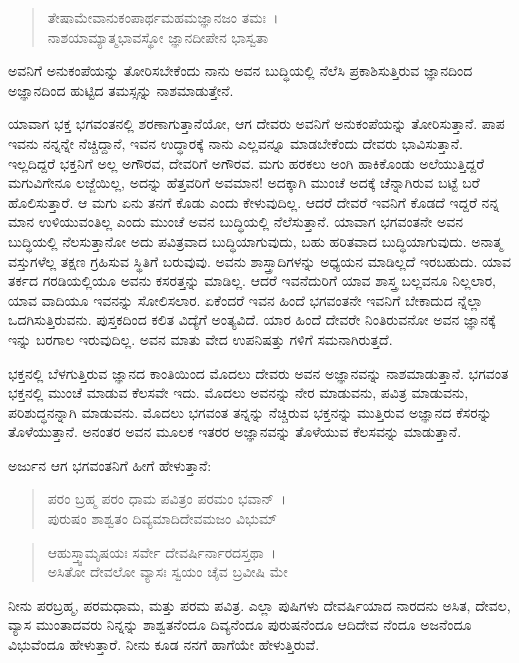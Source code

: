\begin{verse}
ತೇಷಾಮೇವಾನುಕಂಪಾರ್ಥಮಹಮಜ್ಞಾನಜಂ ತಮಃ~।\\ನಾಶಯಾಮ್ಯಾತ್ಮಭಾವಸ್ಥೋ ಜ್ಞಾನದೀಪೇನ ಭಾಸ್ವತಾ 
\end{verse}

{\small ಅವನಿಗೆ ಅನುಕಂಪೆಯನ್ನು ತೋರಿಸಬೇಕೆಂದು ನಾನು ಅವನ ಬುದ್ಧಿಯಲ್ಲಿ ನೆಲೆಸಿ ಪ್ರಕಾಶಿಸುತ್ತಿರುವ ಜ್ಞಾನದಿಂದ ಅಜ್ಞಾನದಿಂದ ಹುಟ್ಟಿದ ತಮಸ್ಸನ್ನು ನಾಶಮಾಡುತ್ತೇನೆ.}

ಯಾವಾಗ ಭಕ್ತ ಭಗವಂತನಲ್ಲಿ ಶರಣಾಗುತ್ತಾನೆಯೋ, ಆಗ ದೇವರು ಅವನಿಗೆ ಅನುಕಂಪೆಯನ್ನು ತೋರಿಸುತ್ತಾನೆ. ಪಾಪ ಇವನು ನನ್ನನ್ನೇ ನೆಚ್ಚಿದ್ದಾನೆ, ಇವನ ಉದ್ಧಾರಕ್ಕೆ ನಾನು ಎಲ್ಲವನ್ನೂ ಮಾಡಬೇಕೆಂದು ದೇವರು ಭಾವಿಸುತ್ತಾನೆ. ಇಲ್ಲದಿದ್ದರೆ ಭಕ್ತನಿಗೆ ಅಲ್ಲ ಅಗೌರವ, ದೇವರಿಗೆ ಅಗೌರವ. ಮಗು ಹರಕಲು ಅಂಗಿ ಹಾಕಿಕೊಂಡು ಅಲೆಯುತ್ತಿದ್ದರೆ ಮಗುವಿಗೇನೂ ಲಜ್ಜೆಯಿಲ್ಲ, ಅದನ್ನು ಹೆತ್ತವರಿಗೆ ಅವಮಾನ! ಅದಕ್ಕಾಗಿ ಮುಂಚೆ ಅದಕ್ಕೆ ಚೆನ್ನಾಗಿರುವ ಬಟ್ಟೆ ಬರೆ ಹೊಲಿಸುತ್ತಾರೆ. ಆ ಮಗು ಏನು ತನಗೆ ಕೊಡು ಎಂದು ಕೇಳುವುದಿಲ್ಲ. ಆದರೆ ದೇವರೆ ಇವನಿಗೆ ಕೊಡದೆ ಇದ್ದರೆ ನನ್ನ ಮಾನ ಉಳಿಯುವಂತಿಲ್ಲ ಎಂದು ಮುಂಚೆ ಅವನ ಬುದ್ಧಿಯಲ್ಲಿ ನೆಲೆಸುತ್ತಾನೆ. ಯಾವಾಗ ಭಗವಂತನೇ ಅವನ ಬುದ್ಧಿಯಲ್ಲಿ ನೆಲಸುತ್ತಾನೋ ಅದು ಪವಿತ್ರವಾದ ಬುದ್ಧಿಯಾಗುವುದು, ಬಹು ಹರಿತವಾದ ಬುದ್ಧಿಯಾಗುವುದು. ಅನಾತ್ಮ ವಸ್ತುಗಳೆಲ್ಲ ತಕ್ಷಣ ಗ್ರಹಿಸುವ ಸ್ಥಿತಿಗೆ ಬರುವುವು. ಅವನು ಶಾಸ್ತ್ರಾದಿಗಳನ್ನು ಅಧ್ಯಯನ ಮಾಡಿಲ್ಲದೆ ಇರಬಹುದು. ಯಾವ ತರ್ಕದ ಗರಡಿಯಲ್ಲಿಯೂ ಅವನು ಕಸರತ್ತನ್ನು ಮಾಡಿಲ್ಲ. ಆದರೆ ಇವನೆದುರಿಗೆ ಯಾವ ಶಾಸ್ತ್ರ ಬಲ್ಲವನೂ ನಿಲ್ಲಲಾರ, ಯಾವ ವಾದಿಯೂ ಇವನನ್ನು ಸೋಲಿಸಲಾರ. ಏಕೆಂದರೆ ಇವನ ಹಿಂದೆ ಭಗವಂತನೇ ಇವನಿಗೆ ಬೇಕಾದುದ ನ್ನೆಲ್ಲಾ ಒದಗಿಸುತ್ತಿರುವನು. ಪುಸ್ತಕದಿಂದ ಕಲಿತ ವಿದ್ಯೆಗೆ ಅಂತ್ಯವಿದೆ. ಯಾರ ಹಿಂದೆ ದೇವರೇ ನಿಂತಿರುವನೋ ಅವನ ಜ್ಞಾನಕ್ಕೆ ಇನ್ನು ಬರಗಾಲ ಇರುವುದಿಲ್ಲ. ಅವನ ಮಾತು ವೇದ ಉಪನಿಷತ್ತು ಗಳಿಗೆ ಸಮನಾಗಿರುತ್ತದೆ.

ಭಕ್ತನಲ್ಲಿ ಬೆಳಗುತ್ತಿರುವ ಜ್ಞಾನದ ಕಾಂತಿಯಿಂದ ಮೊದಲು ದೇವರು ಅವನ ಅಜ್ಞಾನವನ್ನು ನಾಶಮಾಡುತ್ತಾನೆ. ಭಗವಂತ ಭಕ್ತನಲ್ಲಿ ಮುಂಚೆ ಮಾಡುವ ಕೆಲಸವೇ ಇದು. ಮೊದಲು ಅವನನ್ನು ನೇರ ಮಾಡುವನು, ಪವಿತ್ರ ಮಾಡುವನು, ಪರಿಶುದ್ಧನನ್ನಾಗಿ ಮಾಡುವನು. ಮೊದಲು ಭಗವಂತ ತನ್ನನ್ನು ನೆಚ್ಚಿರುವ ಭಕ್ತನನ್ನು ಮುತ್ತಿರುವ ಅಜ್ಞಾನದ ಕೆಸರನ್ನು ತೊಳೆಯುತ್ತಾನೆ. ಅನಂತರ ಅವನ ಮೂಲಕ ಇತರರ ಅಜ್ಞಾನವನ್ನು ತೊಳೆಯುವ ಕೆಲಸವನ್ನು ಮಾಡುತ್ತಾನೆ.

ಅರ್ಜುನ ಆಗ ಭಗವಂತನಿಗೆ ಹೀಗೆ ಹೇಳುತ್ತಾನೆ:

\begin{verse}
ಪರಂ ಬ್ರಹ್ಮ ಪರಂ ಧಾಮ ಪವಿತ್ರಂ ಪರಮಂ ಭವಾನ್~।\\ಪುರುಷಂ ಶಾಶ್ವತಂ ದಿವ್ಯಮಾದಿದೇವಮಜಂ ವಿಭುಮ್ 
\end{verse}

\begin{verse}
ಆಹುಸ್ತ್ವಾಮೃಷಯಃ ಸರ್ವೇ ದೇವರ್ಷಿರ್ನಾರದಸ್ತಥಾ~।\\ಅಸಿತೋ ದೇವಲೋ ವ್ಯಾಸಃ ಸ್ವಯಂ ಚೈವ ಬ್ರವೀಷಿ ಮೇ 
\end{verse}

{\small ನೀನು ಪರಬ್ರಹ್ಮ, ಪರಮಧಾಮ, ಮತ್ತು ಪರಮ ಪವಿತ್ರ. ಎಲ್ಲಾ ಪುಷಿಗಳು ದೇವರ್ಷಿಯಾದ ನಾರದನು ಅಸಿತ, ದೇವಲ, ವ್ಯಾಸ ಮುಂತಾದವರು ನಿನ್ನನ್ನು ಶಾಶ್ವತನೆಂದೂ ದಿವ್ಯನೆಂದೂ ಪುರುಷನೆಂದೂ ಆದಿದೇವ ನೆಂದೂ ಅಜನೆಂದೂ ವಿಭುವೆಂದೂ ಹೇಳುತ್ತಾರೆ. ನೀನು ಕೂಡ ನನಗೆ ಹಾಗೆಯೇ ಹೇಳುತ್ತಿರುವೆ. }

